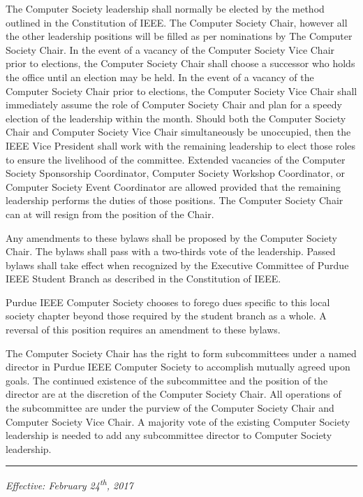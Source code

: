 \documentclass[12pt]{constitution}
\begin{document}
The Computer Society leadership shall normally be elected by the method outlined in the Constitution of IEEE. The Computer Society Chair, however all the other leadership positions will be filled as per nominations by The Computer Society Chair. In the event of a vacancy of the Computer Society Vice Chair prior to elections, the Computer Society Chair shall choose a successor who holds the office until an election may be held. In the event of a vacancy of the Computer Society Chair prior to elections, the Computer Society Vice Chair shall immediately assume the role of Computer Society Chair and plan for a speedy election of the leadership within the month. Should both the Computer Society Chair and Computer Society Vice Chair simultaneously be unoccupied, then the IEEE Vice President shall work with the remaining leadership to elect those roles to ensure the livelihood of the committee. Extended vacancies of the Computer Society Sponsorship Coordinator, Computer Society Workshop Coordinator, or Computer Society Event Coordinator are allowed provided that the remaining leadership performs the duties of those positions. The Computer Society Chair can at will resign from the position of the Chair.


\label{art:amend}

Any amendments to these bylaws shall be proposed by the Computer Society Chair. The bylaws shall pass with a two-thirds vote of the leadership. Passed bylaws shall take effect when recognized by the Executive Committee of Purdue IEEE Student Branch as described in the Constitution of IEEE.


\label{art:dues}

Purdue IEEE Computer Society chooses to forego dues specific to this local society chapter beyond those required by the student branch as a whole. A reversal of this position requires an amendment to these bylaws.


\label{art:subcommittee}

The Computer Society Chair has the right to form subcommittees under a named director in Purdue IEEE Computer Society to accomplish mutually agreed upon goals. The continued existence of the subcommittee and the position of the director are at the discretion of the Computer Society Chair. All operations of the subcommittee are under the purview of the Computer Society Chair and Computer Society Vice Chair. A majority vote of the existing Computer Society leadership is needed to add any subcommittee director to Computer Society leadership.



\vspace{12pt}
\hrule

\textit{Effective: February 24\textsuperscript{th}, 2017}


\setcounter{tocdepth}{1}
\listoftodos %
\end{document}
